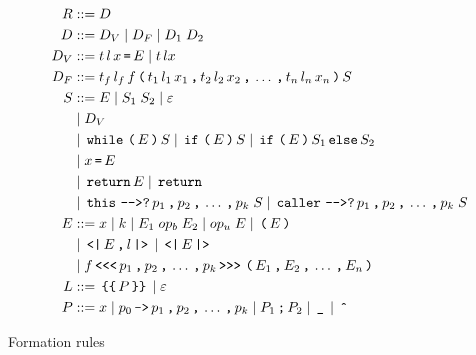 \begin{table}[h!]
  \begin{align*}
    R         & ::= D \\
    D         & ::= D_V \gp D_F \gp D_1 \; D_2 \\
    D_V       & ::= t \, l \, x \tk = E \gp t \, l x \\
    D_F       & ::= t_f \, l_f \, f \tk ( t_1 \, l_1 \, x_1 \tk , t_2 \, l_2 \, x_2 \tk , \dots \tk , t_n \, l_n \, x_n \tk ) S \\
    S         & ::= E \gp S_1 \; S_2 \gp \varepsilon \\
              & \gp D_V \\
              & \gp \tk{while} \tk ( E \tk ) S \gp \tk{if} \tk ( E \tk ) S \gp \tk{if} \tk ( E \tk ) S_1 \tk{else} S_2 \\
              & \gp x \tk = E \\
              & \gp \tk{return} E \gp \tk{return} \\
              & \gp \tk{this} \tk{-{}->?} p_1 \tk , p_2 \tk , \dots \tk , p_k \; S \gp \tk{caller} \tk{-{}->?} p_1 \tk , p_2 \tk , \dots \tk , p_k \; S \\
    E         & ::= x \gp k \gp E_1 \; op_b \; E_2 \gp op_u \; E \gp \tk ( E \tk ) \\
              & \gp \tk{<|} E \tk , l \tk{|>} \gp \tk{<|} E \tk{|>} \\
              & \gp f \tk{<{}<{}<} p_1 \tk , p_2 \tk , \dots \tk , p_k \tk{>{}>{}>} \tk ( E_1 \tk , E_2 \tk , \dots \tk , E_n \tk ) \\
    L         & ::= \tk{\{\{} P \tk{\}\}} \gp \varepsilon \\
    P       & ::= x \gp p_0 \tk{->} p_1 \tk , p_2 \tk , \dots \tk , p_k \gp P_1 \tk ; P_2 \gp \tk \_ \gp \tk{\^{}}
  \end{align*}
  \caption{Formation rules}
  \label{ctif:rules}
\end{table}

